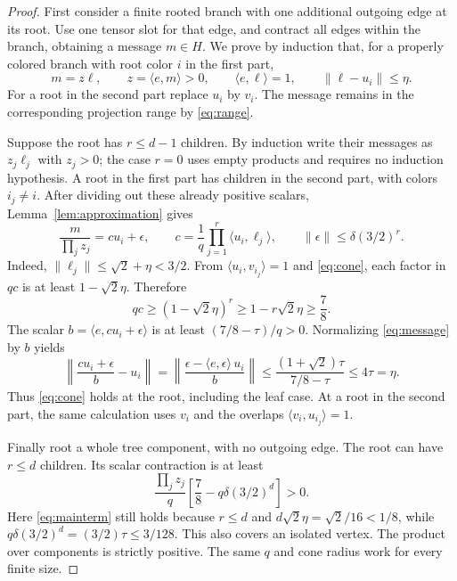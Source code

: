 \documentclass[11pt]{amsart}
\newcommand{\ip}[2]{\langle #1,#2\rangle}
\begin{document}
\begin{proof}
First consider a finite rooted branch with one additional outgoing edge at
its root. Use one tensor slot for that edge, and contract all edges within
the branch, obtaining a message $m\in H$. We prove by induction that, for
a properly colored branch with root color $i$ in the first part,
\begin{equation}\label{eq:cone}
m=z\ell,\qquad z=\ip e m>0,\qquad
\ip e\ell=1,\qquad \|\ell-u_i\|\leq\eta.
\end{equation}
For a root in the second part replace $u_i$ by $v_i$. The message remains in
the corresponding projection range by \eqref{eq:range}.

Suppose the root has $r\leq d-1$ children. By induction write their messages
as $z_j\ell_j$ with $z_j>0$; the case $r=0$ uses empty products and requires
no induction hypothesis. A root in the first part has children in the second
part, with colors $i_j\ne i$. After dividing out these already positive
scalars, Lemma~\ref{lem:approximation} gives
\begin{equation}\label{eq:message}
\frac{m}{\prod_j z_j}=c u_i+\epsilon,\qquad
c=\frac1q\prod_{j=1}^r\ip{u_i}{\ell_j},\qquad
\|\epsilon\|\leq\delta(3/2)^r.
\end{equation}
Indeed, $\|\ell_j\|\leq\sqrt2+\eta<3/2$. From
$\ip{u_i}{v_{i_j}}=1$ and \eqref{eq:cone}, each factor in $qc$ is at least
$1-\sqrt2\eta$. Therefore
\begin{equation}\label{eq:mainterm}
qc\geq(1-\sqrt2\eta)^r\geq1-r\sqrt2\eta\geq\frac78.
\end{equation}
The scalar $b=\ip e{c u_i+\epsilon}$ is at least
$(7/8-\tau)/q>0$. Normalizing \eqref{eq:message} by $b$ yields
\[
\left\|\frac{c u_i+\epsilon}{b}-u_i\right\|
=\left\|\frac{\epsilon-\ip e\epsilon\,u_i}{b}\right\|
\leq\frac{(1+\sqrt2)\tau}{7/8-\tau}\leq4\tau=\eta.
\]
Thus \eqref{eq:cone} holds at the root, including the leaf case. At a root in
the second part, the same calculation uses $v_i$ and the overlaps
$\ip{v_i}{u_{i_j}}=1$.

Finally root a whole tree component, with no outgoing edge. The root can
have $r\leq d$ children. Its scalar contraction is at least
\begin{equation}\label{eq:rootpositive}
\frac{\prod_j z_j}{q}
\left[\frac78-q\delta(3/2)^d\right]>0.
\end{equation}
Here \eqref{eq:mainterm} still holds because $r\leq d$ and
$d\sqrt2\eta=\sqrt2/16<1/8$, while
$q\delta(3/2)^d=(3/2)\tau\leq3/128$. This also covers an isolated vertex.
The product over components is strictly positive. The same $q$ and cone
radius work for every finite size.
\end{proof}
\end{document}
